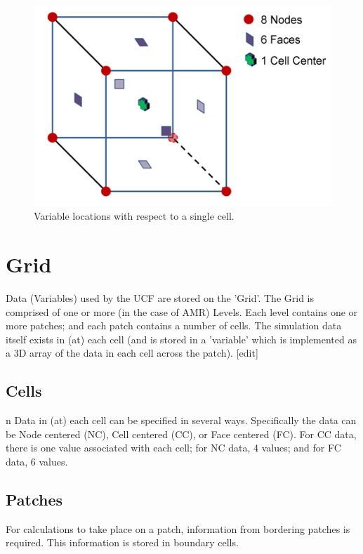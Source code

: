 \documentclass[12pt]{report}
\begin{document}
\begin{figure}
  \includegraphics{DWVariablesCell.png}
  \caption{Variable locations with respect to a single cell.}
  \label{Fig:DWVariablesCell}
\end{figure}



\section{Grid}

Data (Variables) used by the UCF are stored on the 'Grid'. The Grid is comprised of one or more (in the case of AMR) Levels. Each level contains one or more patches; and each patch contains a number of cells. The simulation data itself exists in (at) each cell (and is stored in a 'variable' which is implemented as a 3D array of the data in each cell across the patch).
[edit] 

\subsection{Cells}
n
Data in (at) each cell can be specified in several ways. Specifically the data can be Node centered (NC), Cell centered (CC), or Face centered (FC). For CC data, there is one value associated with each cell; for NC data, 4 values; and for FC data, 6 values. 

\subsection{Patches}

For calculations to take place on a patch, information from bordering patches is required. This information is stored in boundary cells. 
\end{document}
